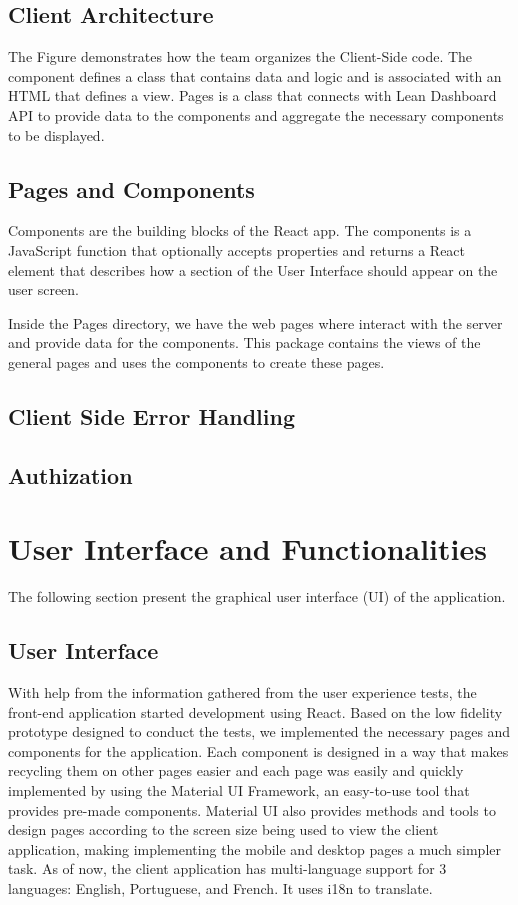 \documentclass[a4paper,twoside,10pt]{report}
\begin{document}
\section{Client Architecture}
 The Figure demonstrates how the team organizes the Client-Side code. 
 \newline
The component defines a class that contains data and logic and is associated with an HTML that defines a view.
\newline
Pages is a class that connects with Lean Dashboard API to provide data to the components and aggregate the necessary components to be displayed. 
\section{Pages and Components}
Components are the building blocks of the React app. The components is a JavaScript function that optionally accepts properties and returns a React element that describes how a section of the User Interface should appear on the user screen. 

Inside the Pages directory, we have the web pages where interact with the server and provide data for the components. This package contains the views of the general pages and uses the components to create these pages. 
\section{Client Side Error Handling}
\section{Authization}
\chapter{User Interface and Functionalities}
The following section present the graphical user interface (UI) of the application.
\section{User Interface}
With help from the information gathered from the user experience tests, the front-end application started development using React.
\newline
Based on the low fidelity prototype designed to conduct the tests, we implemented the necessary pages and components for the application.
\newline
Each component is designed in a way that makes recycling them on other pages easier and each page was easily and quickly implemented by using the Material UI Framework, an easy-to-use tool that provides pre-made components.
Material UI also provides methods and tools to design pages according to the screen size being used to view the client application, making implementing the mobile and desktop pages a much simpler task.
\newline
As of now, the client application has multi-language support for 3 languages: English, Portuguese, and French. It uses i18n to translate.
 
\end{document}
